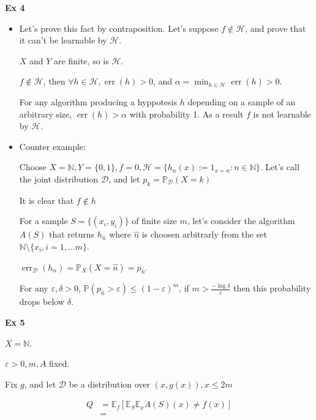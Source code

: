 \documentclass[12pt]{article}
\newcommand{\Q}[1]{\textbf{Ex #1}}
\newcommand{\esp}{{\mathbb E}}
\DeclareMathOperator{\err}{err}
\begin{document}
\Q{4}
\begin{itemize}
\item
  Let's prove this fact by contraposition. Let's suppose $f \not \in \mathcal H$, and prove that it can't be learnable by $\mathcal H$.
  
  $X$ and $Y$ are finite, so is $\mathcal H$.
  
  $f \not \in \mathcal H$, then $\forall h \in \mathcal H, \err(h) > 0$, and $\alpha = \min_{h \in \mathcal H} \err(h) > 0$.

  For any algorithm producing a hyppotesis $h$ depending on a sample of an arbitrary size, $\err(h) > \alpha$ with probability 1.
  As a result $f$ is not learnable by $\mathcal H$.
  
\item
  Counter example:
  
  Choose $X = \mathbb N, Y = \{0, 1\}, f = 0, \mathcal H = \{ h_n(x) := 1_{x = n} : n \in \mathbb N \}$.
  Let's call the joint distribution $\mathcal D$, and let $p_k = \mathbb P_{\mathcal D}(X = k)$
  
  It is clear that $f \not \in h$

  For a sample $S = \{ (x_i, y_i) \}$ of finite size $m$, let's consider the algorithm $A(S)$ that returns $h_{\hat n}$ where $\hat n$ is choosen arbitrarly from the set $\mathbb N \setminus \{ x_i, i = 1, \ldots m \}$.
  
  $\err_{\mathcal D}(h_n) = \mathbb P_{X}(X = \hat n) = p_{\hat n}$.

  For any $\varepsilon, \delta > 0$, $\mathbb{P}( p_{\hat n} > \varepsilon ) \le (1 - \varepsilon)^m$, if $m > \frac{-\log \delta} \varepsilon$ then this probability drops below $\delta$.

\end{itemize}

\Q{5}

$X = \mathbb N$.

$\varepsilon > 0, m, A$ fixed.

Fix $g$, and let $\mathcal D$ be a distribution over $(x, g(x)), x \le 2m$

\begin{align*}
  Q &= \esp_f [ \esp_S \esp_x A(S)(x) \ne f(x)]
  \\&=  
\end{align*}
\end{document}
